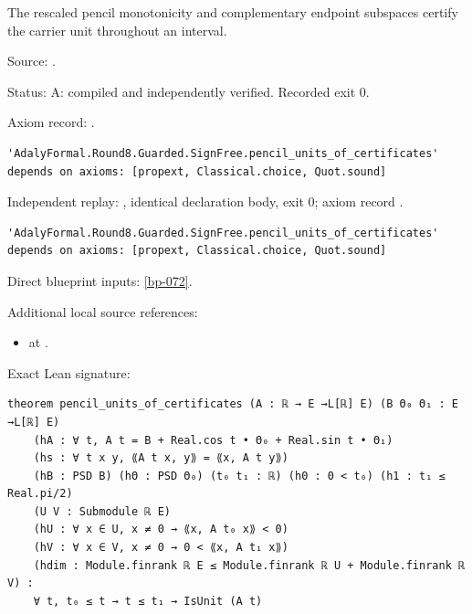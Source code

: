 \begin{theorem}[bp-073]
\label{bp-073}
\leanok
The rescaled pencil monotonicity and complementary endpoint subspaces certify the carrier unit throughout an interval.

\par Source: \texttt{}.
\par Status: A: compiled and independently verified. Recorded exit 0.
\par Axiom record: \texttt{}.
\begin{verbatim}
'AdalyFormal.Round8.Guarded.SignFree.pencil_units_of_certificates' depends on axioms: [propext, Classical.choice, Quot.sound]
\end{verbatim}
\par Independent replay: \texttt{}, identical declaration body, exit 0; axiom record \texttt{}.
\begin{verbatim}
'AdalyFormal.Round8.Guarded.SignFree.pencil_units_of_certificates' depends on axioms: [propext, Classical.choice, Quot.sound]
\end{verbatim}
\par Direct blueprint inputs: \ref{bp-072}.
\par Additional local source references:
\begin{itemize}
\item \texttt{} at \texttt{}.
\end{itemize}
\par Exact Lean signature:
\begin{verbatim}
theorem pencil_units_of_certificates (A : ℝ → E →L[ℝ] E) (B Θ₀ Θ₁ : E →L[ℝ] E)
    (hA : ∀ t, A t = B + Real.cos t • Θ₀ + Real.sin t • Θ₁)
    (hs : ∀ t x y, ⟪A t x, y⟫ = ⟪x, A t y⟫)
    (hB : PSD B) (hΘ : PSD Θ₀) (t₀ t₁ : ℝ) (h0 : 0 < t₀) (h1 : t₁ ≤ Real.pi/2)
    (U V : Submodule ℝ E)
    (hU : ∀ x ∈ U, x ≠ 0 → ⟪x, A t₀ x⟫ < 0)
    (hV : ∀ x ∈ V, x ≠ 0 → 0 < ⟪x, A t₁ x⟫)
    (hdim : Module.finrank ℝ E ≤ Module.finrank ℝ U + Module.finrank ℝ V) :
    ∀ t, t₀ ≤ t → t ≤ t₁ → IsUnit (A t)
\end{verbatim}
\end{theorem}


